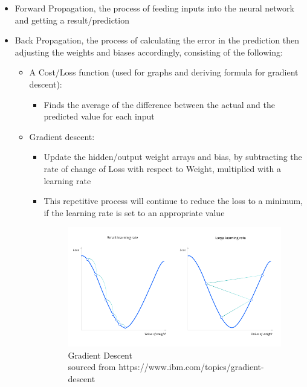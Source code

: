 \documentclass[10pt,a4paper]{article}
\begin{document}
\begin{itemize}
    \item Forward Propagation, the process of feeding inputs into the neural network and getting a result/prediction
    \item Back Propagation, the process of calculating the error in the prediction then adjusting the weights and biases accordingly, consisting of the following:
    \begin {itemize}
        \item A Cost/Loss function (used for graphs and deriving formula for gradient descent):
        \begin{itemize}
            \item Finds the average of the difference between the actual and the predicted value for each input
        \end{itemize}
        \item Gradient descent:
        \begin{itemize}
            \item Update the hidden/output weight arrays and bias, by subtracting the rate of change of Loss with respect to Weight, multiplied with a learning rate
            \item This repetitive process will continue to reduce the loss to a minimum, if the learning rate is set to an appropriate value
                \begin{figure}[h!]
                \centering
                \includegraphics[width=1\textwidth]{./docs/models/src/images/gradient-descent.png}
                \caption{Gradient Descent\\
                         sourced from https://www.ibm.com/topics/gradient-descent}
                \end{figure}
        \end{itemize}
    \end{itemize}
\end{itemize}
\end{document}
